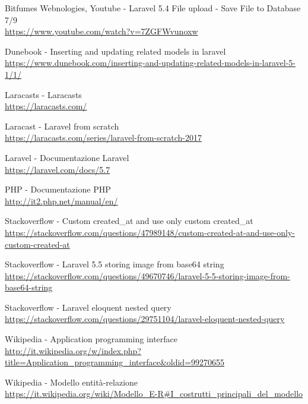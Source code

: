 \documentclass[a4paper,12pt]{book}
\begin{document}
	
	
	
	\tableofcontents
	
	\frontmatter
	
	\mainmatter
	
	
	
	
	
	
	
	\backmatter
	\renewcommand\bibname{Sitografia}
	\begin{thebibliography}{100}

		 Bitfumes Webnologies, Youtube - Laravel 5.4 File upload - Save File to Database 7/9 \\
		\url{https://www.youtube.com/watch?v=7ZGFWvunoxw}	
		
		 Dunebook - Inserting and updating related models in laravel \\
		\url{https://www.dunebook.com/inserting-and-updating-related-models-in-laravel-5-1/1/}
	
		 Laracasts - Laracasts \\
		\url{https://laracasts.com/}	
		
		 Laracast - Laravel from scratch \\
		\url{https://laracasts.com/series/laravel-from-scratch-2017}
		
		 Laravel - Documentazione Laravel\\
		\url{https://laravel.com/docs/5.7}
	
		 PHP - Documentazione PHP \\
		\url{http://it2.php.net/manual/en/}
	
		 Stackoverflow - Custom created\_at and use only custom created\_at \\
		\url{https://stackoverflow.com/questions/47989148/custom-created-at-and-use-only-custom-created-at}
		
		 Stackoverflow - Laravel 5.5 storing image from base64 string \\
		\url{https://stackoverflow.com/questions/49670746/laravel-5-5-storing-image-from-base64-string}
		
		 Stackoverflow - Laravel eloquent nested query \\
		\url{https://stackoverflow.com/questions/29751104/laravel-eloquent-nested-query}
	
		 Wikipedia - Application programming interface \\ \url{http://it.wikipedia.org/w/index.php?title=Application_programming_interface&oldid=99270655}
	
		 Wikipedia - Modello entità-relazione \\
		\url{https://it.wikipedia.org/wiki/Modello_E-R#I_costrutti_principali_del_modello		}
	\end{thebibliography}
	
\end{document}
